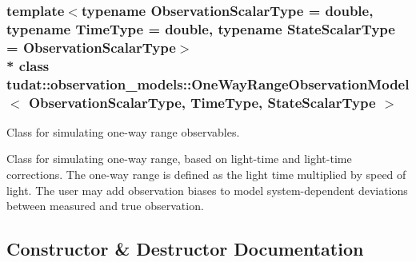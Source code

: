\subsubsection*{template$<$typename Observation\+Scalar\+Type = double, typename Time\+Type = double, typename State\+Scalar\+Type = Observation\+Scalar\+Type$>$\\*
class tudat\+::observation\+\_\+models\+::\+One\+Way\+Range\+Observation\+Model$<$ Observation\+Scalar\+Type, Time\+Type, State\+Scalar\+Type $>$}

Class for simulating one-\/way range observables. 

Class for simulating one-\/way range, based on light-\/time and light-\/time corrections. The one-\/way range is defined as the light time multiplied by speed of light. The user may add observation biases to model system-\/dependent deviations between measured and true observation. 

\subsection{Constructor \& Destructor Documentation}
